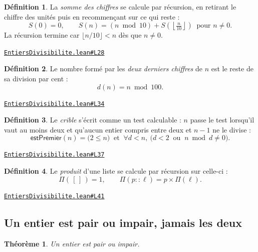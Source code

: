 \documentclass[11pt,a4paper]{article}
\theoremstyle{definition}
\newtheorem{definition}{Définition}
\theoremstyle{plain}
\newtheorem{theoreme}{Théorème}
\newcommand{\source}[2]{\par\smallskip\noindent\hfill{\footnotesize\href{#1}{\texttt{#2}}}\par\smallskip}
\begin{document}
\begin{definition}
La \emph{somme des chiffres} se calcule par récursion, en retirant le chiffre des
unités puis en recommençant sur ce qui reste :
\[ S(0) = 0, \qquad
   S(n) = (n \bmod 10) + S\!\left(\left\lfloor \tfrac{n}{10} \right\rfloor\right)
   \ \text{ pour } n \ne 0 . \]
La récursion termine car $\lfloor n/10 \rfloor < n$ dès que $n \ne 0$.
\end{definition}
\source{https://github.com/Commutator-IO/learn-lean/blob/main/courses/01-college/01-nombres-et-calculs/EntiersDivisibilite.lean\#L28}{EntiersDivisibilite.lean\#L28}

\begin{definition}
Le nombre formé par les \emph{deux derniers chiffres} de $n$ est le reste de sa
division par cent :
\[ d(n) = n \bmod 100 . \]
\end{definition}
\source{https://github.com/Commutator-IO/learn-lean/blob/main/courses/01-college/01-nombres-et-calculs/EntiersDivisibilite.lean\#L34}{EntiersDivisibilite.lean\#L34}

\begin{definition}
Le \emph{crible} s'écrit comme un test calculable : $n$ passe le test lorsqu'il vaut au
moins deux et qu'aucun entier compris entre deux et $n-1$ ne le divise :
\[ \textsf{estPremier}(n) = \bigl(2 \le n\bigr) \ \text{ et } \
   \forall d < n,\ \bigl(d < 2 \ \text{ ou } \ n \bmod d \ne 0\bigr) . \]
\end{definition}
\source{https://github.com/Commutator-IO/learn-lean/blob/main/courses/01-college/01-nombres-et-calculs/EntiersDivisibilite.lean\#L37}{EntiersDivisibilite.lean\#L37}

\begin{definition}
Le \emph{produit} d'une liste se calcule par récursion sur celle-ci :
\[ \Pi(\,[\,]\,) = 1, \qquad \Pi(p :: \ell) = p \times \Pi(\ell) . \]
\end{definition}
\source{https://github.com/Commutator-IO/learn-lean/blob/main/courses/01-college/01-nombres-et-calculs/EntiersDivisibilite.lean\#L41}{EntiersDivisibilite.lean\#L41}

\subsection{Un entier est pair ou impair, jamais les deux}

\begin{theoreme}
Un entier est pair ou impair.
\end{theoreme}
\end{document}
